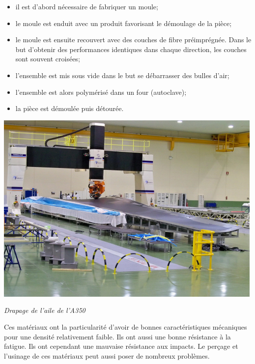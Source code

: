 \documentclass[11pt,oneside]{article}
\begin{document}
\begin{minipage}[c]{.6\linewidth}
\begin{itemize}
\item il est d'abord nécessaire de fabriquer un moule;
\item le moule est enduit avec un produit favorisant le démoulage de la pièce;
\item le moule est ensuite recouvert avec des couches de fibre préimprégnée. Dans le but d'obtenir des performances identiques dans chaque direction, les couches sont souvent croisées;
\item l'ensemble est mis sous vide dans le but se débarrasser des bulles d'air; 
\item l'ensemble est alors polymérisé dans un four (autoclave);
\item la pièce est démoulée puis détourée. 
\end{itemize}
\end{minipage}\hfill
\begin{minipage}[c]{.35\linewidth}
\begin{center}
\includegraphics[width=.9\textwidth]{png/a350}

\textit{Drapage de l'aile de l'A350 \cite{a350}}
\end{center}
\end{minipage}

\vspace{.5cm}

Ces matériaux ont la particularité d'avoir de bonnes caractéristiques mécaniques pour une densité relativement faible. Ils ont aussi une bonne résistance à la fatigue. Ils ont cependant une mauvaise résistance aux impacts. Le perçage et l'usinage de ces matériaux peut aussi poser de nombreux problèmes.
\end{document}
